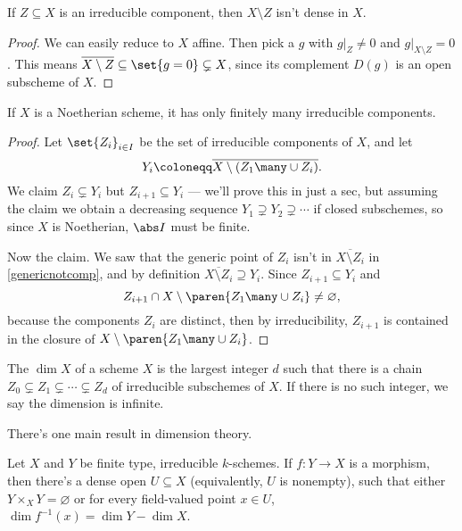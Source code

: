 \begin{cor}
\label{genericnotcomp}
If $Z\subseteq X$ is an irreducible component, then $X\setminus Z$ isn't dense in $X$.
\end{cor}
\begin{proof}
We can easily reduce to $X$ affine. Then pick a $g$ with $g|_Z\ne 0$ and $g|_{X\setminus Z} = 0$. This means
$\overline{X\setminus Z}\subseteq\set{g = 0}\subsetneq X$, since its complement $D(g)$ is an open subscheme of $X$.
\end{proof}
\begin{cor}
If $X$ is a Noetherian scheme, it has only finitely many irreducible components.
\end{cor}
\begin{proof}
Let $\set{Z_i}_{i\in I}$ be the set of irreducible components of $X$, and let
\begin{equation}
	Y_i\coloneqq \overline{X\setminus (Z_1\many\cup Z_i)}.
\end{equation}
We claim $Z_i\subsetneq Y_i$ but $Z_{i+1}\subseteq Y_i$ --- we'll prove this in just a sec, but assuming the claim
we obtain a decreasing sequence $Y_1\supsetneq Y_2\supsetneq\dotsb$ if closed subschemes, so since $X$ is
Noetherian, $\abs I$ must be finite.

Now the claim. We saw that the generic point of $Z_i$ isn't in $\overline{X\setminus Z_i}$ in
\cref{genericnotcomp}, and by definition $\overline{X\setminus Z_i}\supseteq Y_i$. Since $Z_{i+1}\subseteq Y_i$ and
\begin{equation}
	Z_{i+1}\cap X\setminus\paren{Z_1\many\cup Z_i} \ne\varnothing,
\end{equation}
because the components $Z_i$ are distinct, then by irreducibility, $Z_{i+1}$ is contained in the closure of
$X\setminus\paren{Z_1\many\cup Z_i}$.
\end{proof}
\begin{defn}
The  $\dim X$ of a scheme $X$ is the largest integer $d$ such that there is a chain
$Z_0\subsetneq Z_1\subsetneq\dotsb\subsetneq Z_d$ of irreducible subschemes of $X$. If there is no such integer, we
say the dimension is infinite.
\end{defn}
There's one main result in dimension theory.
\begin{thm}
\label{dimthm}
Let $X$ and $Y$ be finite type, irreducible $k$-schemes. If $f\colon Y\to X$ is a morphism, then there's a dense
open $U\subseteq X$ (equivalently, $U$ is nonempty), such that either $Y\times_X Y = \varnothing$ or for every
field-valued point $x\in U$, $\dim f^{-1}(x) = \dim Y - \dim X$.
\end{thm}
